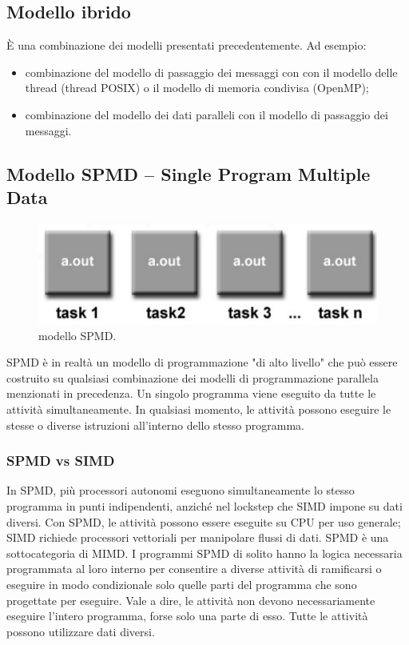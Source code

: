 \subsection{Modello ibrido}	È una combinazione dei modelli presentati precedentemente. Ad esempio:
\begin{itemize}
	\item combinazione del modello di passaggio dei messaggi con con il modello delle thread (thread POSIX) o il modello di memoria condivisa (OpenMP);
	\item combinazione del modello dei dati paralleli con il modello di passaggio dei messaggi.
\end{itemize}
\subsection{Modello SPMD -- Single Program Multiple Data}
\begin{figure}[th]
	\centering
	\includegraphics[width=0.7\linewidth]{img/spmd}
	\caption{modello SPMD.}
	\label{fig:spmd}
\end{figure}

SPMD è in realtà un modello di programmazione "di alto livello" che può essere costruito
su qualsiasi combinazione dei modelli di programmazione parallela menzionati in precedenza.
Un singolo programma viene eseguito da tutte le attività simultaneamente.
In qualsiasi momento, le attività possono eseguire le stesse o diverse
istruzioni all'interno dello stesso programma.
\subsubsection*{SPMD vs SIMD}
In SPMD, più processori autonomi eseguono simultaneamente lo stesso
programma in punti indipendenti, anziché nel lockstep che SIMD impone
su dati diversi.
 Con SPMD, le attività possono essere eseguite su CPU per uso generale; SIMD richiede
processori vettoriali per manipolare flussi di dati.
 SPMD è una sottocategoria di MIMD.
I programmi SPMD di solito hanno la logica necessaria programmata al loro interno per
consentire a diverse attività di ramificarsi o eseguire in modo condizionale solo quelle parti del
programma che sono progettate per eseguire. Vale a dire, le attività non devono necessariamente
eseguire l'intero programma, forse solo una parte di esso.
Tutte le attività possono utilizzare dati diversi.
